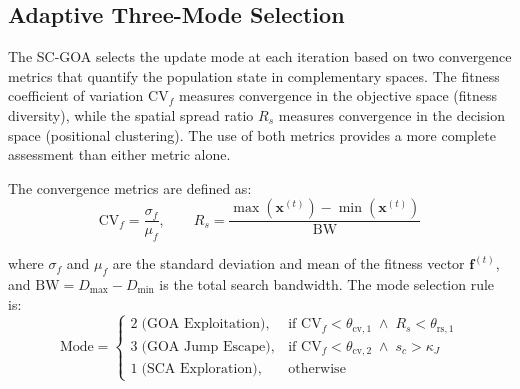 \documentclass[a4paper, 12pt]{article}
\begin{document}
\subsection{Adaptive Three-Mode Selection}
\label{subsec:mode_selection}

The SC-GOA selects the update mode at each iteration based on two convergence metrics that quantify the population state in complementary spaces. The fitness coefficient of variation $\mathrm{CV}_f$ measures convergence in the objective space (fitness diversity), while the spatial spread ratio $R_s$ measures convergence in the decision space (positional clustering). The use of both metrics provides a more complete assessment than either metric alone.

The convergence metrics are defined as:
\begin{equation}
    \mathrm{CV}_f = \frac{\sigma_f}{\mu_f}, \qquad
    R_s = \frac{\max(\mathbf{x}^{(t)}) - \min(\mathbf{x}^{(t)})}{\mathrm{BW}}
    \label{eq:convergence_metrics}
\end{equation}

where $\sigma_f$ and $\mu_f$ are the standard deviation and mean of the fitness vector $\mathbf{f}^{(t)}$, and $\mathrm{BW} = D_{\max} - D_{\min}$ is the total search bandwidth. The mode selection rule is:
\begin{equation}
    \text{Mode} =
    \begin{cases}
        2 \;\text{(GOA Exploitation)}, & \text{if } \mathrm{CV}_f < \theta_{\mathrm{cv},1} \;\wedge\; R_s < \theta_{\mathrm{rs},1} \\[4pt]
        3 \;\text{(GOA Jump Escape)},  & \text{if } \mathrm{CV}_f < \theta_{\mathrm{cv},2} \;\wedge\; s_c > \kappa_J \\[4pt]
        1 \;\text{(SCA Exploration)},  & \text{otherwise}
    \end{cases}
    \label{eq:mode_selection}
\end{equation}
\end{document}
